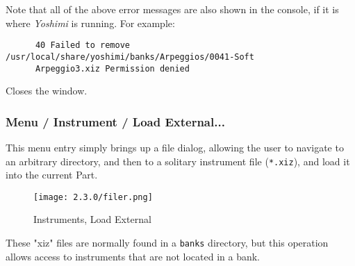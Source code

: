    Note that all of the above error messages are also shown in the console, if
   it is where \textsl{Yoshimi} is running.  For example:

   \begin{verbatim}
      40 Failed to remove /usr/local/share/yoshimi/banks/Arpeggios/0041-Soft
      Arpeggio3.xiz Permission denied
   \end{verbatim}



   Closes the window.

%
%

\subsubsection{Menu / Instrument / Load External...}
\label{subsubsec:menu_instrument_load}

   This menu entry simply brings up a file dialog, allowing the user to
   navigate to an arbitrary directory, and then to a solitary instrument file
   (\texttt{*.xiz}), and load it into the current Part.

\begin{figure}[H]
   \centering
   \texttt{[image: 2.3.0/filer.png]}
   \caption{Instruments, Load External}
   \label{fig:instruments_load_external}
\end{figure}

   These "xiz" files are normally found in a \texttt{banks} directory, but
   this operation allows access to instruments that are not located in a bank.

